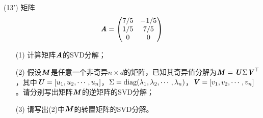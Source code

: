 \documentclass[12pt,a4paper,openany,twoside]{ctexbook}
\begin{document}
\begin{exercise}(13')
	矩阵\[ \boldsymbol{\mathit{A}} = \begin{pmatrix}
		7/5&-1/5\\
		1/5&7/5\\
		0&0
	\end{pmatrix}
 \]
 \begin{itemize}
 	\item [(1)] 计算矩阵$ \boldsymbol{\mathit{A}} $的SVD分解；
 	\item [(2)] 假设$\boldsymbol{\mathit{M}}$是任意一个非奇异$n \times d$的矩阵，已知其奇异值分解为$\boldsymbol{\mathit{M}} = \boldsymbol{\mathit{U}} \Sigma \boldsymbol{\mathit{V}}^\top$，其中$\boldsymbol{\mathit{U}} = [u_1, u_2, \cdots, u_n]$，$\Sigma = \mathop{\rm diag}\nolimits(\lambda_1, \lambda_2, \cdots, \lambda_n)$，$\boldsymbol{\mathit{V}} = [v_1, v_2, \cdots, v_n]$。请分别写出矩阵$\boldsymbol{\mathit{M}}$的逆矩阵的SVD分解；
 	\item [(3)] 请写出(2)中$\boldsymbol{\mathit{M}}$的转置矩阵的SVD分解。
 \end{itemize}
\end{exercise}
\end{document}
